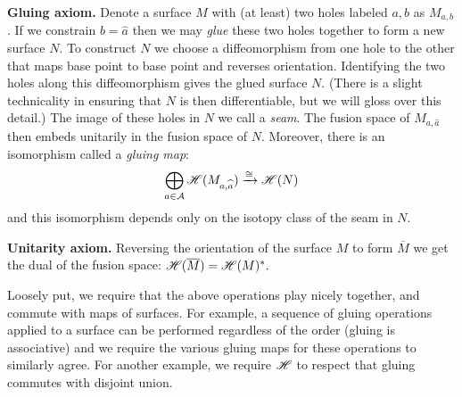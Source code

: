 \documentclass[aps, prl, letterpaper, twocolumn, superscriptaddress, notitlepage, 10pt]{revtex4-1}
\begin{document}
{\bf Gluing axiom.}
Denote a surface $M$ with (at least) two holes
labeled $a, b$ as $M_{a,b}$. 
If we constrain $b=\widehat{a}$ 
then we may \emph{glue} these two holes together
to form a new surface $N$.
To construct $N$ we choose a diffeomorphism from one
hole to the other that maps base point to base point 
and reverses orientation.
Identifying the two holes along this diffeomorphism
gives the glued surface $N$.
(There is a slight technicality in ensuring that $N$ is
then differentiable, but we will gloss over this detail.)
The image of these holes in $N$ we call a \emph{seam}.
The fusion space of $M_{a,\widehat{a}}$ then embeds unitarily in the fusion
space of $N$.
Moreover, there is an isomorphism called
a \emph{gluing map}:
$$
    \bigoplus_{a\in\mathcal{A}} \mathscr{H}(M_{a,\widehat{a}}) \xrightarrow{\cong} \mathscr{H}(N)
$$
and this isomorphism depends only on the isotopy class of 
the seam in $N.$

{\bf Unitarity axiom.}
Reversing the orientation of the surface $M$
to form $\overline{M}$ we get the dual of the fusion space:
$\mathscr{H}(\overline{M})=\mathscr{H}(M)^*.$

Loosely put, we require that the above operations play nicely together,
and commute with maps of surfaces.
For example,
a sequence of gluing operations 
applied to a surface can
be performed regardless of the order (gluing is associative)
and we require the various gluing maps for these operations to similarly agree.
For another example, we require $\mathscr{H}$ to respect that gluing
commutes with disjoint union.
\end{document}

